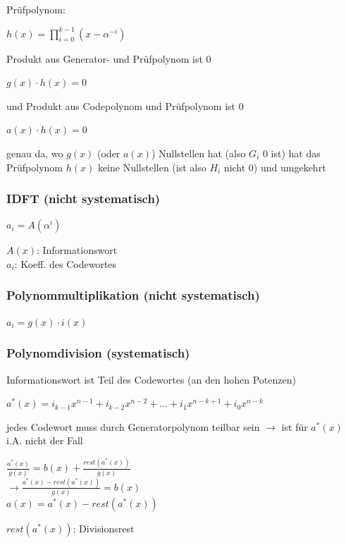 Prüfpolynom:

$\displaystyle{
    h(x) = \prod_{i=0}^{k-1} \left(x - \alpha^{-i}\right)
}$

Produkt aus Generator- und Prüfpolynom ist 0

$\displaystyle{
    g(x) \cdot h(x) = 0
}$

und Produkt aus Codepolynom und Prüfpolynom ist 0

$\displaystyle{
    a(x) \cdot h(x) = 0
}$

genau da, wo $g(x)$ (oder $a(x)$) Nullstellen hat (also $G_i$ 0 ist) hat das Prüfpolynom $h(x)$ keine Nullstellen
(ist also $H_i$ nicht 0) und umgekehrt

\subsubsection{IDFT (nicht systematisch)}

$\displaystyle{
    a_i = A(\alpha^i)
}$

$A(x)$: Informationswort\\
$a_i$: Koeff. des Codewortes

\subsubsection{Polynommultiplikation (nicht systematisch)}

$\displaystyle{
    a_i = g(x) \cdot i(x)
}$

\subsubsection{Polynomdivision (systematisch)}

Informationswort ist Teil des Codewortes (an den hohen Potenzen)

$\displaystyle{
    a^*(x) = i_{k-1} x^{n-1} + i_{k-2} x^{n-2} + ... + i_1 x^{n-k+1} + i_0 x^{n-k}
}$

jedes Codewort muss durch Generatorpolynom teilbar sein $\rightarrow$ ist
für $a^*(x)$ i.A. nicht der Fall

$\displaystyle{
    \frac{a^*(x)}{g(x)} = b(x) + \frac{rest(a^*(x))}{g(x)}
}$\\
$\displaystyle{
    \rightarrow \frac{a^*(x) - rest\left(a^*(x)\right)}{g(x)} = b(x)
}$\\
$\displaystyle{
    a(x) = a^*(x) - rest\left(a^*(x)\right)
}$

$rest\left(a^*(x)\right)$: Divisionsrest

